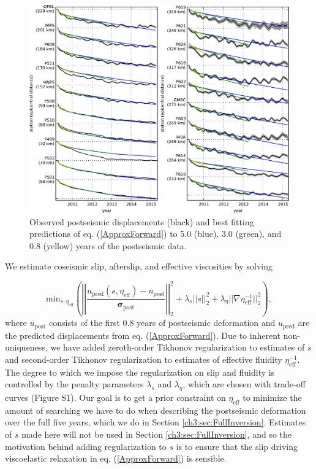 \begin{figure}
\includegraphics[scale=1.0]{ch3/figures/2016jb013114-p10}
\centering 
\caption{Observed postseismic displacements (black) and best fitting predictions of eq. (\ref{ApproxForward}) to 5.0 (blue), 3.0 (green), and 0.8 (yellow) years of the postseismic data.} 
\label{ch3:fig:RecordSection1}
\end{figure}

We estimate coseismic slip, afterslip, and effective viscosities by solving 

\begin{equation}\label{ObjectiveFunction}
 \mathrm{min}_{s,\eta_\mathrm{eff}} \left(\left|\left|
 \frac{u_\mathrm{pred}(s,\eta_\mathrm{eff}) - u_\mathrm{post}}
 {\mathbf{\sigma_\mathrm{post}}}\right|\right|_2^2 + 
 \lambda_s||s||_2^2 + 
 \lambda_\eta||\nabla \eta_{\mathrm{eff}}^{-1}||_2^2\right),
\end{equation} 
where $u_\mathrm{post}$ consists of the first 0.8 years of postseismic deformation and $u_\mathrm{pred}$ are the predicted displacements from eq. (\ref{ApproxForward}).  Due to inherent non-uniqueness, we have added zeroth-order Tikhonov regularization to estimates of $s$ and second-order Tikhonov regularization to estimates of effective fluidity $\eta_\mathrm{eff}^{-1}$. The degree to which we impose the regularization on slip and fluidity is controlled by the penalty parameters $\lambda_s$ and $\lambda_\eta$, which are chosen with trade-off curves (Figure S1).  Our goal is to get a prior constraint on $\eta_{\mathrm{eff}}$ to minimize the amount of searching we have to do when describing the postseismic deformation over the full five years, which we do in Section \ref{ch3:sec:FullInversion}.  Estimates of $s$ made here will not be used in Section \ref{ch3:sec:FullInversion}, and so the motivation behind adding regularization to $s$ is to ensure that the slip driving viscoelastic relaxation in eq. (\ref{ApproxForward}) is sensible.  

